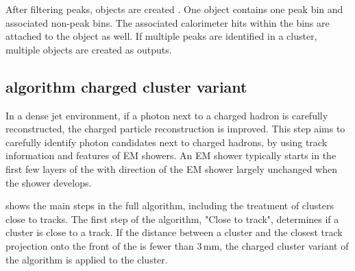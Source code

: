 After  filtering peaks,  \ShowerPeak  objects are created . One \ShowerPeak object contains one peak bin and associated non-peak bins. The associated calorimeter hits within the bins are attached to the \ShowerPeak object as well. If multiple peaks are identified in a cluster, multiple \ShowerPeak objects are created as outputs.



\subsection{\peakFinding algorithm charged cluster variant}
\label{sec:photon2Dtrack}

In a dense jet environment, if a photon next to a charged hadron is carefully reconstructed, the charged particle reconstruction is improved. This step aims to carefully identify photon candidates next to charged hadrons, by using track information and features of EM showers. An EM shower typically starts in the first few layers of the \ECAL with  direction of the EM shower largely unchanged when the shower develops.






 shows the main steps in the full \peakFinding algorithm, including the treatment of clusters close to tracks. The first step of the algorithm, "Close to track", determines if a cluster is close to a track. If the distance between a cluster and the closest track projection onto the front of the \ECAL is fewer than 3\,mm, the charged cluster variant of the \peakFinding algorithm is applied to the cluster.

